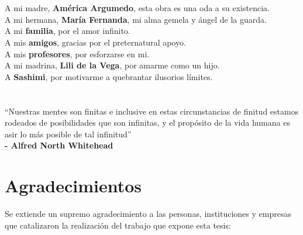 \documentclass[12pt,oneside,letterpaper]{book}
\begin{document}


\chapter*{}
\thispagestyle{empty}
    \null{}
        \begin{flushright}
            A mi madre, \textbf{América Argumedo}, esta obra es una oda a su existencia. \\
            A mi hermana, \textbf{María Fernanda}, mi alma gemela y ángel de la guarda. \\
            A mi \textbf{familia}, por el amor infinito. \\
            A mis \textbf{amigos}, gracias por el preternatural apoyo. \\
            A mis \textbf{profesores}, por esforzarse en mi. \\
            A mi madrina, \textbf{Lili de la Vega}, por amarme como un hijo. \\
            A \textbf{Sashimi}, por motivarme a quebrantar ilusorios límites.
        \end{flushright}
\null{}

\chapter*{}
% 
\begin{minipage}[t]{0.6\textwidth}
    \begin{flushleft}
        \large
        ``Nuestras mentes son finitas e inclusive en estas circunstancias de
        finitud estamos rodeados de posibilidades que son infinitas, y el
        propósito de la vida humana es asir lo más posible de tal infinitud'' \\
        \textbf{- Alfred North Whitehead}
    \end{flushleft}
\end{minipage}



\chapter*{Agradecimientos}
Se extiende un supremo agradecimiento a las personas, instituciones y empresas
que catalizaron la realización del trabajo que expone esta tesis:
\end{document}
